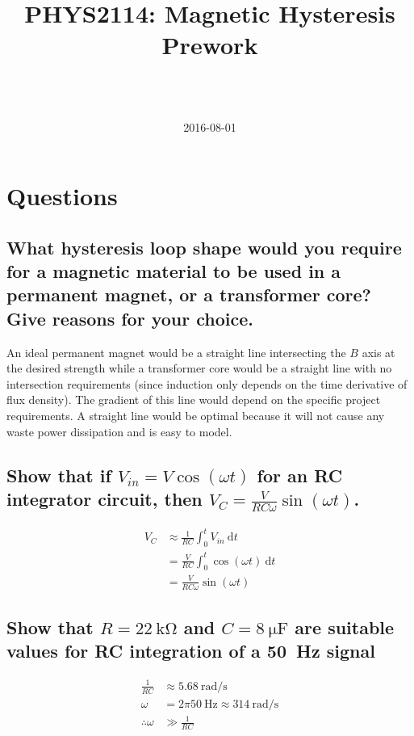 \documentclass[a4paper]{scrartcl}
\begin{document}
\title{PHYS2114: Magnetic Hysteresis Prework}
\author{ \\ \\ }
\date{2016-08-01}
\maketitle

\section{Questions}
\subsection{What hysteresis loop shape would you require for a magnetic material to be used in a permanent magnet, or a transformer core? Give reasons for your choice.}
An ideal permanent magnet would be a straight line intersecting the \(B\) axis at the desired strength while a transformer core would be a straight line with no intersection requirements (since induction only depends on the time derivative of flux density). The gradient of this line would depend on the specific project requirements. A straight line would be optimal because it will not cause any waste power dissipation and is easy to model.

\subsection{Show that if \(V_{in} = V \cos(\omega t)\) for an RC integrator circuit, then \(V_{C} = \frac{V}{R C \omega} \sin(\omega t)\).}
\begin{align*}
    V_C &\approx \frac{1}{R C} \int_0^t V_{in} \:\mathrm{d}t \\
    &= \frac{V}{R C} \int_0^t \cos(\omega t) \:\mathrm{d}t \\
    &= \frac{V}{R C \omega} \sin(\omega t)
\end{align*}

\subsection{Show that \(R = \SI{22}{\kilo\ohm}\) and \(C = \SI{8}{\micro\farad}\) are suitable values for RC integration of a \SI{50}{\hertz} signal}
\begin{align*}
    \frac{1}{R C} &\approx \SI{5.68}{\radian\per\second} \\
    \omega &= 2 \pi \SI{50}{\hertz} \approx \SI{314}{\radian\per\second} \\
    \therefore \omega &\gg \frac{1}{R C}
\end{align*}
\end{document}

